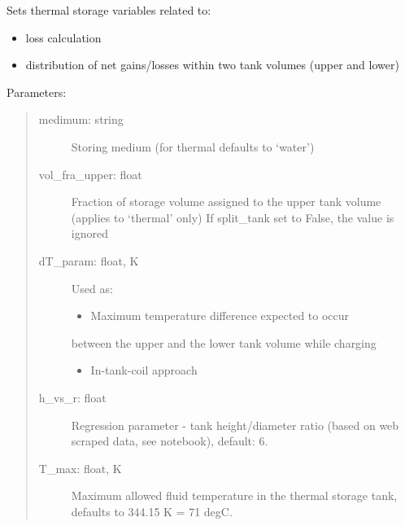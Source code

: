 \documentclass[letterpaper,10pt,english,openany]{sphinxmanual}
\begin{document}
\begin{fulllineitems}
\begin{fulllineitems}
\label{\detokenize{source/mswh.system:mswh.system.components.Storage.setup_thermal}}
Sets thermal storage variables related to:
\begin{itemize}
\item {} 
loss calculation

\item {} 
distribution of net gains/losses within two
tank volumes (upper and lower)

\end{itemize}

Parameters:
\begin{quote}
\begin{description}
\item[{medimum: string}] \leavevmode
Storing medium (for thermal defaults to ‘water’)

\item[{vol\_fra\_upper: float}] \leavevmode
Fraction of storage volume assigned to the upper
tank volume (applies to ‘thermal’ only)
If split\_tank set to False, the value is ignored

\item[{dT\_param: float, K}] \leavevmode
Used as:
\begin{itemize}
\item {} 
Maximum temperature difference expected to occur

\end{itemize}

between the upper and the lower tank volume while charging
\begin{itemize}
\item {} 
In-tank-coil approach

\end{itemize}

\item[{h\_vs\_r: float}] \leavevmode
Regression parameter - tank height/diameter ratio
(based on web scraped data, see
 notebook), default: 6.

\item[{T\_max: float, K}] \leavevmode
Maximum allowed fluid temperature in the thermal
storage tank, defaults to 344.15 K = 71 degC.


\end{description}
\end{quote}
\end{fulllineitems}
\end{fulllineitems}
\end{document}
